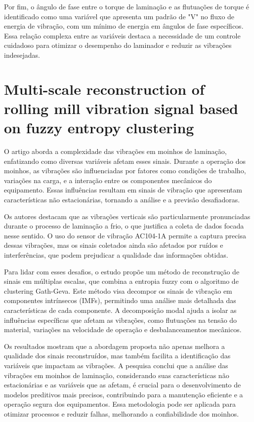 Por fim, o ângulo de fase entre o torque de laminação e as flutuações de torque é identificado como uma variável que apresenta um padrão de "V" no fluxo de energia de vibração, com um mínimo de energia em ângulos de fase específicos. Essa relação complexa entre as variáveis destaca a necessidade de um controle cuidadoso para otimizar o desempenho do laminador e reduzir as vibrações indesejadas.

\section{Multi-scale reconstruction of rolling mill vibration signal based on fuzzy entropy clustering \cite{multi-scale-reconstruction}}
\label{sec:trabalho-relacionado-b}

O artigo aborda a complexidade das vibrações em moinhos de laminação, enfatizando como diversas variáveis afetam esses sinais. Durante a operação dos moinhos, as vibrações são influenciadas por fatores como condições de trabalho, variações na carga, e a interação entre os componentes mecânicos do equipamento. Essas influências resultam em sinais de vibração que apresentam características não estacionárias, tornando a análise e a previsão desafiadoras.

Os autores destacam que as vibrações verticais são particularmente pronunciadas durante o processo de laminação a frio, o que justifica a coleta de dados focada nesse sentido. O uso do sensor de vibração AC104-1A permite a captura precisa dessas vibrações, mas os sinais coletados ainda são afetados por ruídos e interferências, que podem prejudicar a qualidade das informações obtidas.

Para lidar com esses desafios, o estudo propõe um método de reconstrução de sinais em múltiplas escalas, que combina a entropia fuzzy com o algoritmo de clustering Gath-Geva. Este método visa decompor os sinais de vibração em componentes intrínsecos (IMFs), permitindo uma análise mais detalhada das características de cada componente. A decomposição modal ajuda a isolar as influências específicas que afetam as vibrações, como flutuações na tensão do material, variações na velocidade de operação e desbalanceamentos mecânicos.

Os resultados mostram que a abordagem proposta não apenas melhora a qualidade dos sinais reconstruídos, mas também facilita a identificação das variáveis que impactam as vibrações. A pesquisa conclui que a análise das vibrações em moinhos de laminação, considerando suas características não estacionárias e as variáveis que as afetam, é crucial para o desenvolvimento de modelos preditivos mais precisos, contribuindo para a manutenção eficiente e a operação segura dos equipamentos. Essa metodologia pode ser aplicada para otimizar processos e reduzir falhas, melhorando a confiabilidade dos moinhos.